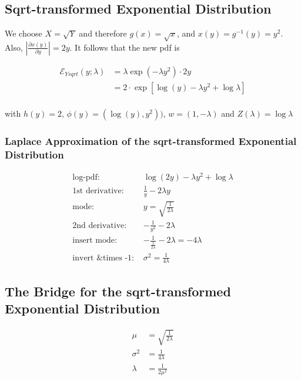 \subsection{Sqrt-transformed Exponential Distribution}

We choose $X = \sqrt{Y}$ and therefore $g(x) = \sqrt{x}$, and $x(y) = g^{-1}(y) = y^2$. Also, $\left\vert \frac{\partial x(y)}{\partial y}\right\vert = 2y$. It follows that the new pdf is 

\begin{align}
\mathcal{E}_{Ysqrt}(y; \lambda) &= \lambda \exp(-\lambda y^2) \cdot 2y \\ \nonumber
&= 2 \cdot \exp\left[\log(y)-\lambda y^2 + \log\lambda\right] \\
\end{align}

with $h(y)=2$, $\phi(y) = (\log(y), y^2))$, $w = (1, -\lambda)$ and $Z(\lambda)=\log\lambda$

\subsubsection{Laplace Approximation of the sqrt-transformed Exponential Distribution}

\begin{align*}
\text{log-pdf: } & \log(2y)-\lambda y^2 + \log\lambda \\
\text{1st derivative: }& \frac{1}{y} - 2\lambda y \\
\text{mode: } & y = \sqrt{\frac{1}{2\lambda}}\\
\text{2nd derivative: }& -\frac{1}{y^2} - 2\lambda\\
\text{insert mode: }& -\frac{1}{\frac{1}{2\lambda}} - 2\lambda = -4\lambda\\
\text{invert \& times -1: }&\sigma^2 = \frac{1}{4\lambda}
\end{align*}

\subsection{The Bridge for the sqrt-transformed Exponential Distribution}

\begin{align}
	\mu &= \sqrt{\frac{1}{2\lambda}} \\
	\sigma^2 &= \frac{1}{4\lambda} \\
	\lambda &= \frac{1}{2\mu^2}
\end{align}